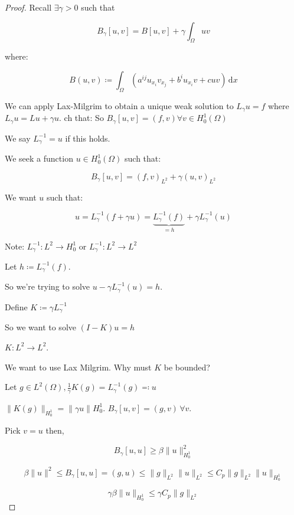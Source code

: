 \documentclass{article}
\theoremstyle{definition}
\begin{document}
\begin{proof}
    Recall \(\exists \gamma > 0\) such that

    \[
        B_\gamma [u,v] = B[u,v] + \gamma \int_\Omega uv
    \]

    where:

    \[
        B(u,v) \coloneqq \int_\Omega (a^{ij} u_{x_i} v_{x_j} + b^i u_{x_i} v + c u v) \, \mathrm{d}x
    \]

    We can apply Lax-Milgrim to obtain a unique weak solution to \(L_\gamma u = f\) where \(L_\gamma u = L u + \gamma u\).
    ch that:
    So \(B_\gamma [u,v] = (f,v) \forall v\in H^1_0(\Omega)\) 
    
    We say \(L_\gamma ^{-1} = u\) if this holds.

    We seek a function \(u\in H^1_0(\Omega)\) such that:

    \[
        B_\gamma [u,v] = (f,v)_{L^2} + \gamma (u,v)_{L^2}
    \]

    We want \(u\) such that:

    \[
        u = L_\gamma^{-1} (f+\gamma u) = \underbrace{L^{ -1}_{\gamma}
         (f)}_{=h} + \gamma L_\gamma^{-1} (u) 
    \]

    Note: \(L_\gamma ^{-1} : L^2 \to H_0^1\) or \(L_\gamma ^{-1}: L^2 \to L^2\) 

    Let \(h \coloneqq L_\gamma ^{-1} (f)\).

    So we're trying to solve \(u - \gamma L_\gamma ^{-1} (u) = h\).

    Define \(K \coloneqq \gamma L_\gamma ^{-1}\) 

    So we want to solve \((I-K)u = h\) 

    \(K: L^2 \to L^2\).

    We want to use Lax Milgrim. Why must \(K\) be bounded?

    Let \(g\in L^2(\Omega), \frac{1}{\gamma}K(g)=L_\gamma ^{-1} (g) \eqqcolon u\) 

    \(\lVert K(g) \rVert _{H_0^1}= \lVert \gamma u \rVert H_0^1\). \(B_\gamma [u,v]=(g,v)\,\forall v\).

    Pick \(v=u\) then,

    \[
        B_\gamma [u,u] \geq \beta \lVert u \rVert ^2_{H^1_0}
    \]

    \[
        \beta \lVert u \rVert ^ 2 \leq B_\gamma [u,u] = (g,u) \leq \lVert g \rVert _{L^2} \lVert u \rVert _{L^2} \leq C_p \lVert g \rVert _{L^2} \lVert u \rVert _{H^1_0}
    \]

    \[
        \gamma \beta \lVert u \rVert _{H^1_0} \leq \gamma C_p \lVert g \rVert _{L^2}
    \]


\end{proof}
\end{document}
